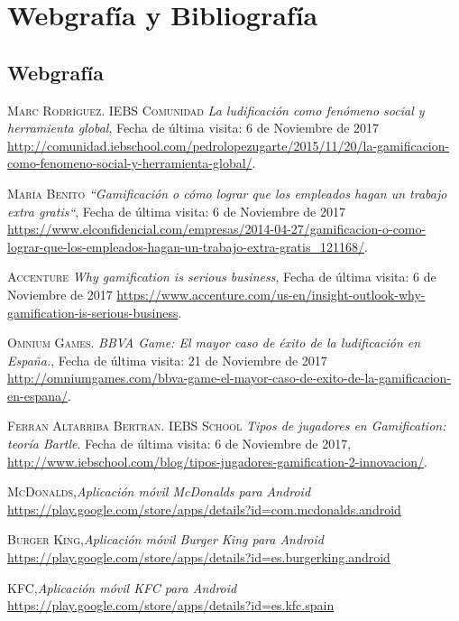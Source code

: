 \documentclass[twoside]{report}
\begin{document}
\chapter{Webgrafía y Bibliografía}
\begin{thebibliography}{a} 
\section{Webgrafía}

 \textsc{Marc Rodríguez. IEBS Comunidad} \textit{La ludificación como fenómeno social y herramienta global}, Fecha de última visita: 6 de Noviembre de 2017 \url{http://comunidad.iebschool.com/pedrolopezugarte/2015/11/20/la-gamificacion-como-fenomeno-social-y-herramienta-global/}.  

 \textsc{María Benito} \textit{“Gamificación o cómo lograr que los empleados hagan un trabajo extra gratis“}, Fecha de última visita: 6 de Noviembre de 2017 \url{https://www.elconfidencial.com/empresas/2014-04-27/gamificacion-o-como-lograr-que-los-empleados-hagan-un-trabajo-extra-gratis_121168/}. 

 \textsc{Accenture} \textit{Why gamification is serious business}, Fecha de última visita: 6 de Noviembre de 2017 \url{https://www.accenture.com/us-en/insight-outlook-why-gamification-is-serious-business}.  

 \textsc{Omnium Games.} \textit{BBVA Game: El mayor caso de éxito de la ludificación en España.}, Fecha de última visita: 21 de Noviembre de 2017 \url{http://omniumgames.com/bbva-game-el-mayor-caso-de-exito-de-la-gamificacion-en-espana/}.  

 \textsc{Ferran Altarriba Bertran. IEBS School} \textit{Tipos de jugadores en Gamification: teoría Bartle}. Fecha de última visita: 6 de Noviembre de 2017, \url{http://www.iebschool.com/blog/tipos-jugadores-gamification-2-innovacion/}.  

 \textsc{McDonalds},\textit{Aplicación móvil McDonalds para Android} \url{https://play.google.com/store/apps/details?id=com.mcdonalds.android}

 \textsc{Burger King},\textit{Aplicación móvil Burger King para Android} \url{https://play.google.com/store/apps/details?id=es.burgerking.android}

 \textsc{KFC},\textit{Aplicación móvil KFC para Android} \url{https://play.google.com/store/apps/details?id=es.kfc.spain}


\end{thebibliography}
\end{document}
